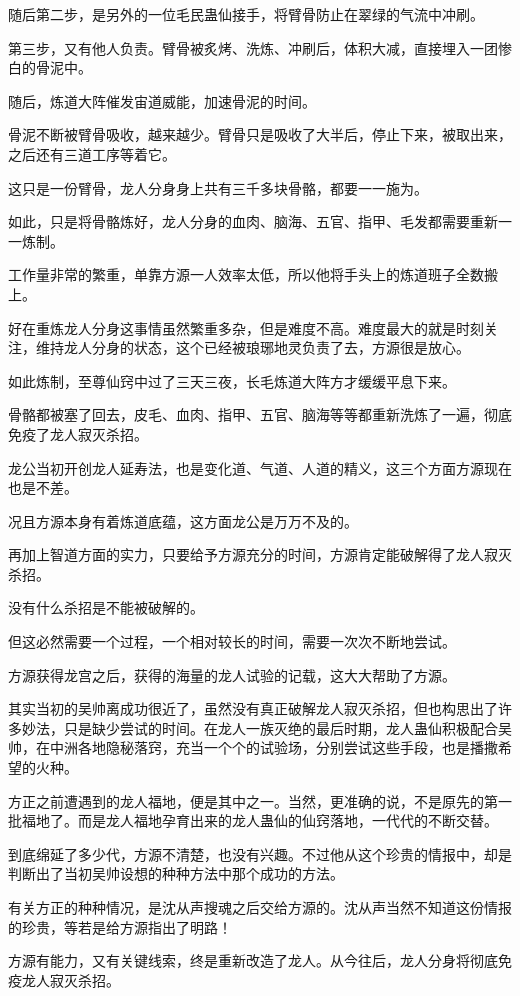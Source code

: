 \begin{this_body}
随后第二步，是另外的一位毛民蛊仙接手，将臂骨防止在翠绿的气流中冲刷。

第三步，又有他人负责。臂骨被炙烤、洗炼、冲刷后，体积大减，直接埋入一团惨白的骨泥中。

随后，炼道大阵催发宙道威能，加速骨泥的时间。

骨泥不断被臂骨吸收，越来越少。臂骨只是吸收了大半后，停止下来，被取出来，之后还有三道工序等着它。

这只是一份臂骨，龙人分身身上共有三千多块骨骼，都要一一施为。

如此，只是将骨骼炼好，龙人分身的血肉、脑海、五官、指甲、毛发都需要重新一一炼制。

工作量非常的繁重，单靠方源一人效率太低，所以他将手头上的炼道班子全数搬上。

好在重炼龙人分身这事情虽然繁重多杂，但是难度不高。难度最大的就是时刻关注，维持龙人分身的状态，这个已经被琅琊地灵负责了去，方源很是放心。

如此炼制，至尊仙窍中过了三天三夜，长毛炼道大阵方才缓缓平息下来。

骨骼都被塞了回去，皮毛、血肉、指甲、五官、脑海等等都重新洗炼了一遍，彻底免疫了龙人寂灭杀招。

龙公当初开创龙人延寿法，也是变化道、气道、人道的精义，这三个方面方源现在也是不差。

况且方源本身有着炼道底蕴，这方面龙公是万万不及的。

再加上智道方面的实力，只要给予方源充分的时间，方源肯定能破解得了龙人寂灭杀招。

没有什么杀招是不能被破解的。

但这必然需要一个过程，一个相对较长的时间，需要一次次不断地尝试。

方源获得龙宫之后，获得的海量的龙人试验的记载，这大大帮助了方源。

其实当初的吴帅离成功很近了，虽然没有真正破解龙人寂灭杀招，但也构思出了许多妙法，只是缺少尝试的时间。在龙人一族灭绝的最后时期，龙人蛊仙积极配合吴帅，在中洲各地隐秘落窍，充当一个个的试验场，分别尝试这些手段，也是播撒希望的火种。

方正之前遭遇到的龙人福地，便是其中之一。当然，更准确的说，不是原先的第一批福地了。而是龙人福地孕育出来的龙人蛊仙的仙窍落地，一代代的不断交替。

到底绵延了多少代，方源不清楚，也没有兴趣。不过他从这个珍贵的情报中，却是判断出了当初吴帅设想的种种方法中那个成功的方法。

有关方正的种种情况，是沈从声搜魂之后交给方源的。沈从声当然不知道这份情报的珍贵，等若是给方源指出了明路！

方源有能力，又有关键线索，终是重新改造了龙人。从今往后，龙人分身将彻底免疫龙人寂灭杀招。


\end{this_body}
